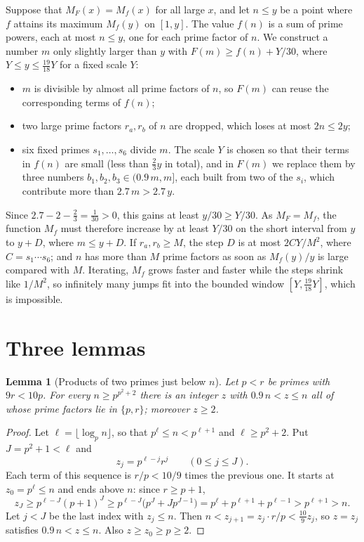 \documentclass[11pt,a4paper]{amsart}
\newtheorem{lemma}{Lemma}
\theoremstyle{remark}
\begin{document}
Suppose that $M_F(x) = M_f(x)$ for all large $x$, and let $n \le y$ be a point where $f$ attains its maximum $M_f(y)$ on $[1, y]$. The value $f(n)$ is a sum of prime powers, each at most $n \le y$, one for each prime factor of $n$. We construct a number $m$ only slightly larger than $y$ with $F(m) \ge f(n) + Y/30$, where $Y \le y \le \frac{19}{18} Y$ for a fixed scale $Y$:
\begin{itemize}
\item $m$ is divisible by almost all prime factors of $n$, so $F(m)$ can reuse the corresponding terms of $f(n)$;
\item two large prime factors $r_a, r_b$ of $n$ are dropped, which loses at most $2n \le 2y$;
\item six fixed primes $s_1, \dots, s_6$ divide $m$. The scale $Y$ is chosen so that their terms in $f(n)$ are small (less than $\frac{2}{3}y$ in total), and in $F(m)$ we replace them by three numbers $b_1, b_2, b_3 \in (0.9\,m, m]$, each built from two of the $s_i$, which contribute more than $2.7\,m > 2.7\,y$.
\end{itemize}
Since $2.7 - 2 - \frac{2}{3} = \frac{1}{30} > 0$, this gains at least $y/30 \ge Y/30$. As $M_F = M_f$, the function $M_f$ must therefore increase by at least $Y/30$ on the short interval from $y$ to $y + D$, where $m \le y + D$. If $r_a, r_b \ge M$, the step $D$ is at most $2CY/M^2$, where $C = s_1 \cdots s_6$; and $n$ has more than $M$ prime factors as soon as $M_f(y)/y$ is large compared with $M$. Iterating, $M_f$ grows faster and faster while the steps shrink like $1/M^2$, so infinitely many jumps fit into the bounded window $[Y, \frac{19}{18} Y]$, which is impossible.

\section{Three lemmas}

\begin{lemma}[Products of two primes just below $n$]\label{lem:smooth}
Let $p < r$ be primes with $9 r < 10 p$. For every $n \ge p^{p^2 + 2}$ there is an integer $z$ with $0.9\, n < z \le n$ all of whose prime factors lie in $\{p, r\}$; moreover $z \ge 2$.
\end{lemma}

\begin{proof}
Let $\ell = \lfloor \log_p n \rfloor$, so that $p^\ell \le n < p^{\ell + 1}$ and $\ell \ge p^2 + 2$. Put $J = p^2 + 1 < \ell$ and
\[
z_j = p^{\ell - j} r^j \qquad (0 \le j \le J).
\]
Each term of this sequence is $r/p < 10/9$ times the previous one. It starts at $z_0 = p^\ell \le n$ and ends above $n$: since $r \ge p + 1$,
\[
z_J \ge p^{\ell - J} (p + 1)^J \ge p^{\ell - J} \bigl(p^J + J p^{J - 1}\bigr) = p^\ell + p^{\ell + 1} + p^{\ell - 1} > p^{\ell + 1} > n.
\]
Let $j < J$ be the last index with $z_j \le n$. Then $n < z_{j + 1} = z_j \cdot r/p < \frac{10}{9} z_j$, so $z = z_j$ satisfies $0.9\, n < z \le n$. Also $z \ge z_0 \ge p \ge 2$.
\end{proof}
\end{document}
